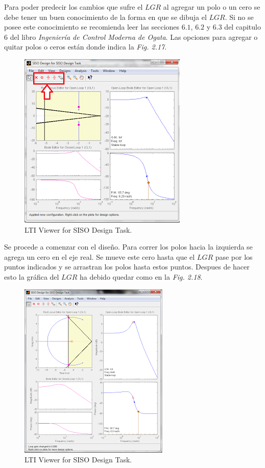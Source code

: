 \documentclass[a4paper,12pt,twoside]{proyectotanquesecci}
\begin{document}
Para poder predecir los cambios que sufre el $LGR$ al agregar un polo o un cero se debe tener un buen conocimiento de la forma en que se dibuja el $LGR$. Si no se posee este conocimiento se recomienda leer las secciones $6.1$, $6.2$ y $6.3$ del capitulo 6 del libro \textit{Ingeniería de Control Moderna de Ogata}. Las opciones para agregar o quitar polos o ceros están donde indica la \textit{Fig. 2.17}. \\

\begin{figure}[h]
\centering
\includegraphics[scale=0.7]{Ventana11}
\renewcommand{\figurename}{Fig.}
\caption{LTI Viewer for SISO Design Task.}
\label{LTI Viewer for SISO Design Task.}
\end{figure}

Se procede a comenzar con el diseño. Para correr los polos hacia la izquierda se agrega un cero en el eje real. Se mueve este cero hasta que el $LGR$ pase por los puntos indicados y se arrastran los polos hasta estos puntos. Despues de hacer esto la gráfica del $LGR$ ha debido quedar como en la \textit{Fig. 2.18}. \\

\begin{figure}[h]
\centering
\includegraphics[scale=0.7]{Ventana12}
\renewcommand{\figurename}{Fig.}
\caption{LTI Viewer for SISO Design Task.}
\label{LTI Viewer for SISO Design Task.}
\end{figure}
\end{document}
